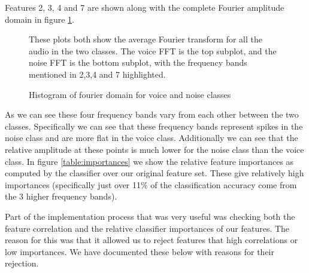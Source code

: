 \documentclass[ %
                    author={Sam Phippen},
                supervisor={Dr. Rafal Bogacz},
                     title={Real time voice activity detectors in noisy personal computing environments},
                  subtitle={},
                    degree={MEng},
                      year={2012} ]{thesis}
\begin{document}
Features 2, 3, 4 and 7 are shown along with the complete Fourier amplitude
domain in figure \ref{fig:frequencies}.

\begin{figure}

    These plots both show the average Fourier transform for all the audio in
    the two classes.  The voice FFT is the top subplot, and the noise FFT is
    the bottom subplot, with the frequency bands mentioned in 2,3,4 and 7
    highlighted.

    \caption{Histogram of fourier domain for voice and noise classes}
    \label{fig:frequencies}
\end{figure}

As we can see these four frequency bands vary from each other between the two
classes. Specifically we can see that these frequency bands represent spikes in
the noise class and are more flat in the voice class. Additionally we can see
that the relative amplitude at these points is much lower for the noise class
than the voice class. In figure \ref{table:importances} we show the relative
feature importances as computed by the classifier over our original feature
set. These give relatively high importances (specifically just over 11\% of the
classification accuracy come from the 3 higher frequency bands).

Part of the implementation process that was very useful was checking both the
feature correlation and the relative classifier importances of our features.
The reason for this was that it allowed us to reject features that high
correlations or low importances. We have documented these below with reasons
for their rejection.
\end{document}
